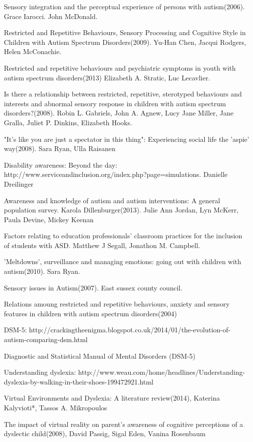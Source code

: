 \documentclass[11pt]{report}
\begin{document}
\begin{thebibliography}{9}
Sensory integration and the perceptual experience of persons with autism(2006). Grace Iarocci. John McDonald.

Restricted and Repetitive Behaviours, Sensory Processing and Cognitive Style in Children with Autism Spectrum Disorders(2009). Yu-Han Chen, Jacqui Rodgers, Helen McConachie.

Restricted and repetitive behaviours and psychiatric symptoms in youth with autism spectrum disorders(2013) Elizabeth A. Stratic, Luc Lecavlier.

Is there a relationship between restricted, repetitive, sterotyped behaviours and interests and abnormal sensory response in children with autism spectrum disorders?(2008). Robin L. Gabriels, John A. Agnew, Lucy Jane Miller, Jane Gralla, Juliet P. Dinkins, Elizabeth Hooks.

"It’s like you are just a spectator in this thing": Experiencing social life the 'aspie' way(2008). Sara Ryan, Ulla Raisanen

Disability awareness: Beyond the day: http://www.serviceandinclusion.org/index.php?page=simulations. Danielle Dreilinger

Awareness and knowledge of autism and autism interventions: A general population survey. Karola Dillenburger(2013). Julie Ann Jordan, Lyn McKerr, Paula Devine, Mickey Keenan

Factors relating to education professionals' classroom practices for the inclusion of students with ASD. Matthew J Segall, Jonathon M. Campbell. 

'Meltdowns', surveillance and managing emotions: going out with children with autism(2010). Sara Ryan.

Sensory issues in Autism(2007). East sussex county council. 

Relations amoung restricted and repetitive behaviours, anxiety and sensory features in children with autism spectrum disorders(2004)

DSM-5: http://crackingtheenigma.blogspot.co.uk/2014/01/the-evolution-of-autism-comparing-dsm.html

Diagnostic and Statistical Manual of Mental Disorders (DSM-5)

Understanding dyslexia: http://www.weau.com/home/headlines/Understanding-dyslexia-by-walking-in-their-shoes-199472921.html

Virtual Environments and Dyslexia: A literature review(2014), Katerina Kalyvioti*, Tassos A. Mikropoulos 

The impact of virtual reality on parent's awareness of cognitive perceptions of a dyslectic child(2008), David Passig, Sigal Eden, Vanina Rosenbaum

\end{thebibliography}
\end{document}
